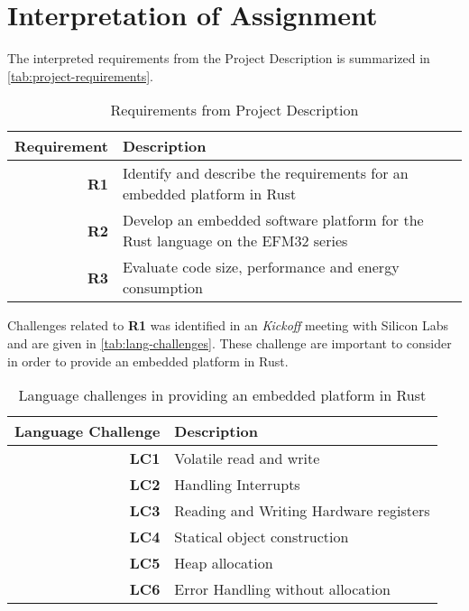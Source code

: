 \section{Interpretation of Assignment}
\label{sec:intro:assignment}

The interpreted requirements from the Project Description is summarized in \autoref{tab:project-requirements}.

\begin{table}[H]
  \centering
  \begin{tabular}{r | p{8cm}}
    \textbf{Requirement} & \textbf{Description} \\
    \hline
    \textbf{R1} & Identify and describe the requirements for an embedded platform in Rust \\
    \textbf{R2} & Develop an embedded software platform for the Rust language on the EFM32 series \\
    \textbf{R3} & Evaluate code size, performance and energy consumption \\
    \hline
  \end{tabular}
  \caption{Requirements from Project Description}
  \label{tab:project-requirements}
\end{table}

Challenges related to \textbf{R1} was identified in an \emph{Kickoff} meeting with Silicon Labs and are given in \autoref{tab:lang-challenges}.
These challenge are important to consider in order to provide an embedded platform in Rust.

\begin{table}[H]
  \centering
  \begin{tabular}{r | l}
    \textbf{Language Challenge} & \textbf{Description} \\
    \hline
    \textbf{LC1} & Volatile read and write \\
    \textbf{LC2} & Handling Interrupts \\
    \textbf{LC3} & Reading and Writing Hardware registers \\
    \textbf{LC4} & Statical object construction \\
    \textbf{LC5} & Heap allocation \\
    \textbf{LC6} & Error Handling without allocation \\
    \hline
  \end{tabular}
  \caption{Language challenges in providing an embedded platform in Rust}
  \label{tab:lang-challenges}
\end{table}

